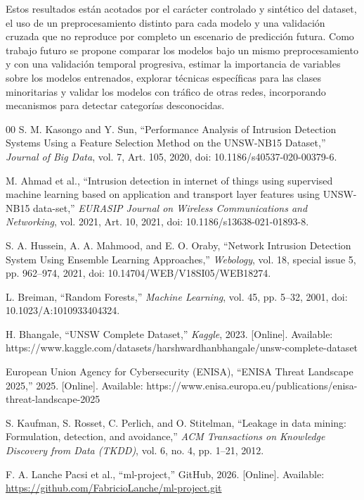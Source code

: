 \documentclass[conference]{IEEEtran}
\begin{document}
Estos resultados están acotados por el carácter controlado y sintético del dataset, el uso de un preprocesamiento distinto para cada modelo y una validación cruzada que no reproduce por completo un escenario de predicción futura. Como trabajo futuro se propone comparar los modelos bajo un mismo preprocesamiento y con una validación temporal progresiva, estimar la importancia de variables sobre los modelos entrenados, explorar técnicas específicas para las clases minoritarias y validar los modelos con tráfico de otras redes, incorporando mecanismos para detectar categorías desconocidas.
\begin{thebibliography}{00}
S. M. Kasongo and Y. Sun,
``Performance Analysis of Intrusion Detection Systems Using a Feature Selection Method on the UNSW-NB15 Dataset,''
\textit{Journal of Big Data}, vol. 7, Art. 105, 2020,
doi: 10.1186/s40537-020-00379-6.

M. Ahmad et al.,
``Intrusion detection in internet of things using supervised machine learning based on application and transport layer features using UNSW-NB15 data-set,''
\textit{EURASIP Journal on Wireless Communications and Networking}, vol. 2021, Art. 10, 2021,
doi: 10.1186/s13638-021-01893-8.

S. A. Hussein, A. A. Mahmood, and E. O. Oraby,
``Network Intrusion Detection System Using Ensemble Learning Approaches,''
\textit{Webology}, vol. 18, special issue 5, pp. 962--974, 2021,
doi: 10.14704/WEB/V18SI05/WEB18274.

L. Breiman,
``Random Forests,''
\textit{Machine Learning}, vol. 45, pp. 5--32, 2001,
doi: 10.1023/A:1010933404324.

H. Bhangale,
``UNSW Complete Dataset,''
\textit{Kaggle}, 2023. [Online]. Available:
https://www.kaggle.com/datasets/harshwardhanbhangale/unsw-complete-dataset

European Union Agency for Cybersecurity (ENISA),
``ENISA Threat Landscape 2025,''
2025. [Online]. Available:
https://www.enisa.europa.eu/publications/enisa-threat-landscape-2025

S. Kaufman, S. Rosset, C. Perlich, and O. Stitelman,
``Leakage in data mining: Formulation, detection, and avoidance,''
\textit{ACM Transactions on Knowledge Discovery from Data (TKDD)},
vol. 6, no. 4, pp. 1--21, 2012.

F. A. Lanche Pacsi et al.,
``ml-project,''
GitHub, 2026. [Online]. Available:
\url{https://github.com/FabricioLanche/ml-project.git}


\end{thebibliography}
\end{document}

